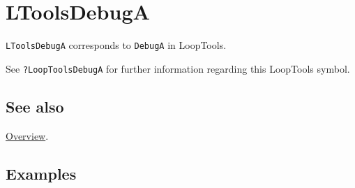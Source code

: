 \documentclass[../FeynHelpersManual.tex]{subfiles}
\begin{document}
\hypertarget{ltoolsdebuga}{
\section{LToolsDebugA}\label{ltoolsdebuga}}

\texttt{LToolsDebugA} corresponds to \texttt{DebugA} in LoopTools.

See \texttt{?LoopTools\textasciigrave DebugA} for further information
regarding this LoopTools symbol.

\subsection{See also}

\hyperlink{toc}{Overview}.

\subsection{Examples}
\end{document}
